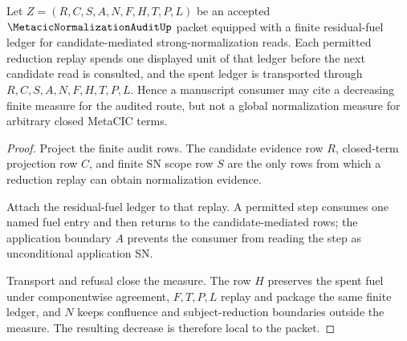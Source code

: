 \begin{theorem}
\label{thm:metacic-normalization-audit-residual-fuel-decreases}
Let $Z=(R,C,S,A,N,F,H,T,P,L)$ be an accepted $\MetacicNormalizationAuditUp$ packet equipped with a finite residual-fuel ledger for candidate-mediated strong-normalization reads. Each permitted reduction replay spends one displayed unit of that ledger before the next candidate read is consulted, and the spent ledger is transported through $R,C,S,A,N,F,H,T,P,L$. Hence a manuscript consumer may cite a decreasing finite measure for the audited route, but not a global normalization measure for arbitrary closed MetaCIC terms.
\end{theorem}
\begin{proof}
Project the finite audit rows. The candidate evidence row $R$, closed-term projection row $C$, and finite SN scope row $S$ are the only rows from which a reduction replay can obtain normalization evidence.

Attach the residual-fuel ledger to that replay. A permitted step consumes one named fuel entry and then returns to the candidate-mediated rows; the application boundary $A$ prevents the consumer from reading the step as unconditional application SN.

Transport and refusal close the measure. The row $H$ preserves the spent fuel under componentwise agreement, $F,T,P,L$ replay and package the same finite ledger, and $N$ keeps confluence and subject-reduction boundaries outside the measure. The resulting decrease is therefore local to the packet.
\end{proof}


